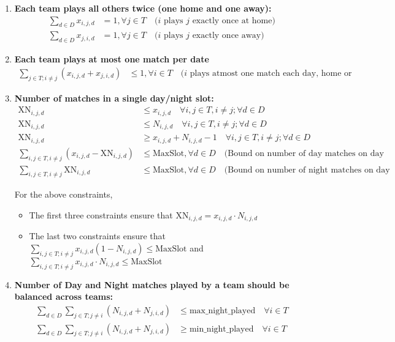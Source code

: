 \documentclass[a4paper, 12pt]{article}
\begin{document}
\begin{enumerate}
    \item \textbf{Each team plays all others twice (one home and one away):}
    \begin{align*}
        \sum_{d \in D} x_{i,j,d} &= 1 , \forall j \in T \quad \text{($i$ plays $j$ exactly once at home)}\\
        \sum_{d \in D} x_{j,i,d} &= 1 , \forall j \in T \quad \text{($i$ plays $j$ exactly once away)}
    \end{align*}

    \item \textbf{Each team plays at most one match per date}
    \begin{align*}
        \sum_{j \in T; i \neq j} (x_{i,j,d} + x_{j,i,d}) &\leq 1, \forall i \in T \quad \text{($i$ plays atmost one match each day, home or away)}
    \end{align*}

    \item \textbf{Number of matches in a single day/night slot:}
    \begin{align*}
        \text{XN}_{i,j,d} &\leq x_{i,j,d} \quad \forall i,j \in T, i \neq j; \forall d \in D\\
        \text{XN}_{i,j,d} &\leq N_{i,j,d} \quad \forall i,j \in T, i \neq j; \forall d \in D\\
        \text{XN}_{i,j,d} &\geq x_{i,j,d} + N_{i,j,d} - 1 \quad \forall i,j \in T, i \neq j; \forall d \in D\\
        \sum_{i,j \in T, i \neq j} (x_{i,j,d} -\text{XN}_{i,j,d}) &\leq \text{MaxSlot}, \forall d \in D \quad \text{(Bound on number of day matches on day d)}\\
        \sum_{i,j \in T, i \neq j} \text{XN}_{i,j,d} &\leq \text{MaxSlot}, \forall d \in D \quad \text{(Bound on number of night matches on day d)}
    \end{align*}

    For the above constraints,
    \begin{itemize}
        \item The first three constraints ensure that $\text{XN}_{i,j,d} = x_{i,j,d}\cdot N_{i,j,d}$
        \item The last two constraints ensure that $\sum_{i,j \in T; i \neq j} x_{i,j,d}(1 - N_{i,j,d}) \leq \text{MaxSlot}$ and $\sum_{i,j \in T; i \neq j} x_{i,j,d}\cdot N_{i,j,d} \leq \text{MaxSlot}$
    \end{itemize}

    \item \textbf{Number of Day and Night matches played by a team should be balanced across teams:}
    \begin{align*}
        \sum_{d \in D} \sum_{j \in T; j \neq i} (N_{i,j,d} + N_{j,i,d}) &\leq \text{max\_night\_played} \quad \forall i \in T\\
        \sum_{d \in D} \sum_{j \in T; j \neq i} (N_{i,j,d} + N_{j,i,d})
        &\geq \text{min\_night\_played} \quad \forall i \in T
    \end{align*}


\end{enumerate}
\end{document}
